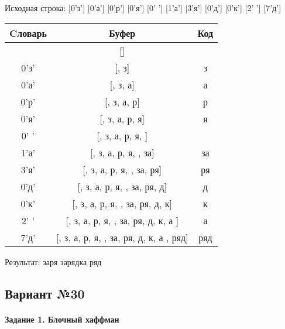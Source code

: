 \documentclass[a4paper, 12pt]{article}
\begin{document}
Исходная строка: [0'з'] [0'а'] [0'р'] [0'я'] [0' '] [1'а'] [3'я'] [0'д'] [0'к'] [2' '] [7'д']\\
\begin{table}[h!]
\centering
\begin{tabular}{|c|c|c|}
\hline
 Cловарь & Буфер & Код  \\ \hline
 & [] & 
\\ \hline
0'з' & [, з] & з
\\ \hline
0'а' & [, з, а] & а
\\ \hline
0'р' & [, з, а, р] & р
\\ \hline
0'я' & [, з, а, р, я] & я
\\ \hline
0' ' & [, з, а, р, я,  ] &  
\\ \hline
1'а' & [, з, а, р, я,  , за] & за
\\ \hline
3'я' & [, з, а, р, я,  , за, ря] & ря
\\ \hline
0'д' & [, з, а, р, я,  , за, ря, д] & д
\\ \hline
0'к' & [, з, а, р, я,  , за, ря, д, к] & к
\\ \hline
2' ' & [, з, а, р, я,  , за, ря, д, к, а ] & а 
\\ \hline
7'д' & [, з, а, р, я,  , за, ря, д, к, а , ряд] & ряд
\\ \hline
\end{tabular}
\end{table}

Результат: заря зарядка ряд
\pagebreak
\subsection{Вариант №30}
\paragraph{Задание 1. Блочный хаффман \\}
\end{document}
